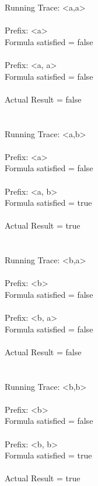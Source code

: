 \noindent Running Trace: \textless a,a\textgreater\\
\\
  Prefix: \textless a\textgreater\\
  Formula satisfied = false\\
\\
  Prefix: \textless a, a\textgreater\\
  Formula satisfied = false\\
\\
  Actual Result = false\\
\\
\\
Running Trace: \textless a,b\textgreater\\
\\
  Prefix: \textless a\textgreater\\
  Formula satisfied = false\\
\\
  Prefix: \textless a, b\textgreater\\
  Formula satisfied = true\\
\\
  Actual Result = true\\
\\
\\
Running Trace: \textless b,a\textgreater\\
\\
  Prefix: \textless b\textgreater\\
  Formula satisfied = false\\
\\
  Prefix: \textless b, a\textgreater\\
  Formula satisfied = false\\
\\
  Actual Result = false\\
\\
\\
Running Trace: \textless b,b\textgreater\\
\\
  Prefix: \textless b\textgreater\\
  Formula satisfied = false\\
\\
  Prefix: \textless b, b\textgreater\\
  Formula satisfied = true\\
\\
  Actual Result = true\\

\newpage

